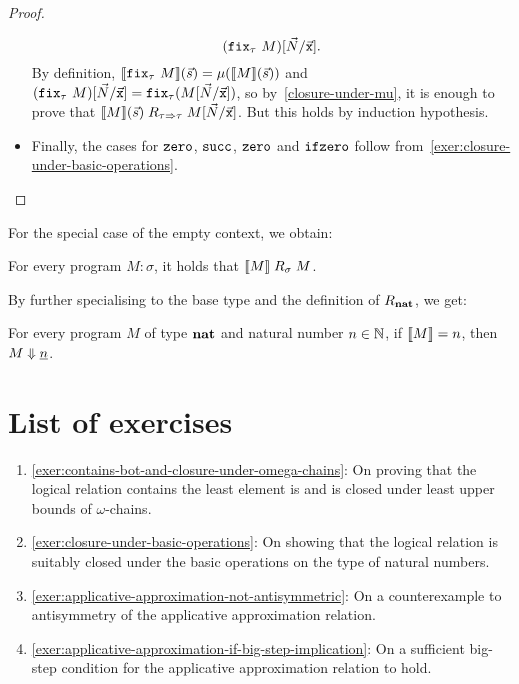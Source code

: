 \begin{proof}
\begin{itemize}
\[      \pa*{\pcffix_\tau\,M}[\vec{N}/\vec{\var x}].
    \]
    By definition,
    \(\densem{\pcffix_\tau\,M}(\vec s) = \mu\pa*{\densem{M}(\vec s)}\) and
    \(\pa*{\pcffix_\tau\, M}[\vec{N}/\vec{\var x}] =
    \pcffix_\tau\pa{M[\vec{N}/\vec{\var{x}}]}\), so by~\cref{closure-under-mu},
    it is enough to prove that
    \(\llbracket M\rrbracket(\vec s) \mathrel{R}_{\tau \Rightarrow \tau}
    M[\vec{N}/\vec{\mathtt{x}}]\). But this holds by induction hypothesis.
  \item Finally, the cases for \(\mathtt{zero}\), \(\operatorname{\mathtt{succ}}\), \(\mathtt{zero}\) and
    \(\operatorname{\mathtt{ifzero}}\) follow from~\cref{exer:closure-under-basic-operations}. \qedhere
  \end{itemize}
\end{proof}

For the special case of the empty context, we obtain:
\begin{corollary}
  For every program \(M : \sigma\), it holds that
  \(\llbracket M\rrbracket \mathrel{R}_\sigma M\).
\end{corollary}
%
By further specialising to the base type and the definition of
\(\mathrel{R}_\mathtt{\mathbf{nat}}\), we get:
\begin{theorem}\label{adequacy}
  For every program \(M\) of type \(\mathtt{\mathbf{nat}}\) and natural number \(n \in \mathbb N\),
  if \(\llbracket M\rrbracket = n\), then \(M \Downarrow \underline{n}\).
\end{theorem}


\section{List of exercises}
\begin{enumerate}
\item \cref{exer:contains-bot-and-closure-under-omega-chains}: On proving that
  the logical relation contains the least element is and is closed under least
  upper bounds of \(\omega\)-chains.
\item \cref{exer:closure-under-basic-operations}: On showing that the logical
  relation is suitably closed under the basic operations on the type of natural
  numbers.
\item \cref{exer:applicative-approximation-not-antisymmetric}: On a
  counterexample to antisymmetry of the applicative approximation relation.
\item \cref{exer:applicative-approximation-if-big-step-implication}: On a
  sufficient big-step condition for the applicative approximation relation to
  hold.
\end{enumerate}

